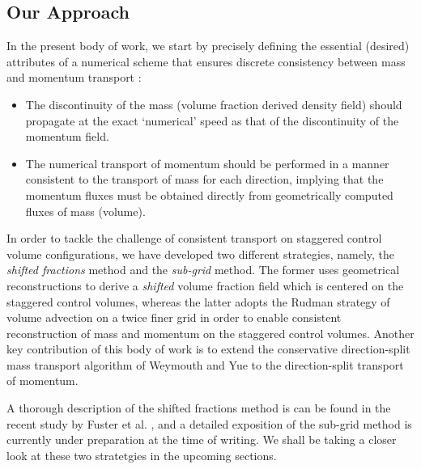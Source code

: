 


\subsection*{Our Approach}

In the present body of work, we start by precisely defining the
essential (desired) attributes of a numerical scheme that 
ensures discrete consistency between mass and momentum transport : 

\begin{itemize}
	\item The discontinuity of the mass (volume fraction 
		derived density field) should propagate at the 
		exact `numerical' speed as that of 
		the discontinuity of the momentum field. 
	\item The numerical transport of momentum should be performed 
		in a manner consistent to the transport of mass for 
		each direction, implying that the momentum fluxes must 
		be obtained directly from geometrically 
		computed fluxes of mass (volume). 
\end{itemize}

In order to tackle the challenge of consistent transport on staggered control 
volume configurations, we have developed two different strategies, namely, 
the \textit{shifted fractions} method and the \textit{sub-grid} method. 
The former uses geometrical reconstructions to derive a 
\textit{shifted} volume fraction field which is centered on the staggered
control volumes, whereas the latter adopts the Rudman \cite{rudman1998volume} 
strategy of volume advection on a twice finer grid in order to 
enable consistent reconstruction of mass and momentum on the staggered control volumes. 
Another key contribution of this body of work is to extend the conservative 
direction-split mass transport algorithm of Weymouth and Yue  
to the direction-split transport of momentum. 

A thorough description of the shifted fractions method is can be found in
the recent study by Fuster et al.  
, and a detailed exposition of the
sub-grid method is currently under preparation at the time of writing.  
We shall be taking a closer look at these two stratetgies in the upcoming sections.  




